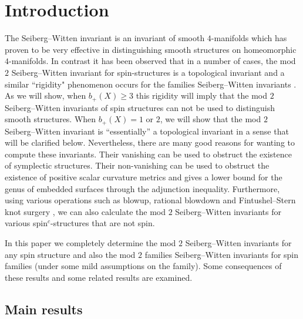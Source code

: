 \documentclass{amsart}
\theoremstyle{definition}
\theoremstyle{remark}
\numberwithin{equation}{section}
\begin{document}
\section{Introduction}

The Seiberg--Witten invariant is an invariant of smooth $4$-manifolds which has proven to be very effective in distinguishing smooth structures on homeomorphic $4$-manifolds. In contrast it has been observed that in a number of cases, the mod $2$ Seiberg--Witten invariant for spin-structures is a topological invariant \cite{ms,rs,bau,li} and a similar ``rigidity" phenomenon occurs for the families Seiberg--Witten invariants \cite{kkn}. As we will show, when $b_+(X) \ge 3$ this rigidity will imply that the mod $2$ Seiberg--Witten invariants of spin structures can not be used to distinguish smooth structures. When $b_+(X) = 1$ or $2$, we will show that the mod $2$ Seiberg--Witten invariant is ``essentially'' a topological invariant in a sense that will be clarified below. Nevertheless, there are many good reasons for wanting to compute these invariants. Their vanishing can be used to obstruct the existence of symplectic structures. Their non-vanishing can be used to obstruct the existence of positive scalar curvature metrics and gives a lower bound for the genus of embedded surfaces through the adjunction inequality. Furthermore, using various operations such as blowup, rational blowdown \cite{fs1} and Fintushel--Stern knot surgery \cite{fs2}, we can also calculate the mod $2$ Seiberg--Witten invariants for various spin$^c$-structures that are not spin.

In this paper we completely determine the mod $2$ Seiberg--Witten invariants for any spin structure and also the mod $2$ families Seiberg--Witten invariants for spin families (under some mild assumptions on the family). Some consequences of these results and some related results are examined.

\subsection{Main results}
\end{document}
